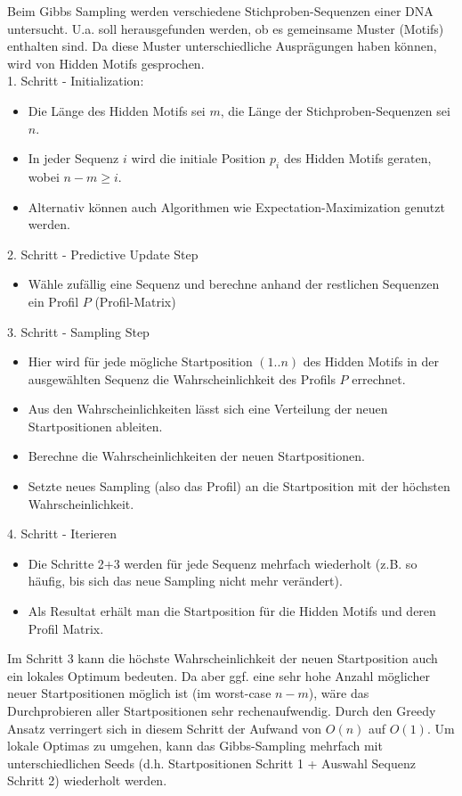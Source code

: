 \documentclass{homework}
\begin{document}
\begin{enumerate}
Beim Gibbs Sampling werden verschiedene Stichproben-Sequenzen einer DNA untersucht. U.a. soll herausgefunden werden, ob es gemeinsame Muster (Motifs) enthalten sind. Da diese Muster unterschiedliche Ausprägungen haben können, wird von Hidden Motifs gesprochen.\\
1. Schritt - Initialization:
\begin{itemize}
	\item Die Länge des Hidden Motifs sei $m$, die Länge der Stichproben-Sequenzen sei $n$.
	\item In jeder Sequenz $i$ wird die initiale Position $p_i$ des Hidden Motifs geraten, wobei $n-m \geq i$.
	\item Alternativ können auch Algorithmen wie Expectation-Maximization genutzt werden.
\end{itemize}
2. Schritt - Predictive Update Step
\begin{itemize}
	\item Wähle zufällig eine Sequenz und berechne anhand der restlichen Sequenzen ein Profil $P$ (Profil-Matrix)
\end{itemize}
3. Schritt - Sampling Step
\begin{itemize}
	\item Hier wird für jede mögliche Startposition $(1..n)$ des Hidden Motifs in der ausgewählten Sequenz die Wahrscheinlichkeit des Profils $P$ errechnet.
	\item Aus den Wahrscheinlichkeiten lässt sich eine Verteilung der neuen Startpositionen ableiten.
	\item Berechne die Wahrscheinlichkeiten der neuen Startpositionen.
	\item Setzte neues Sampling (also das Profil) an die Startposition mit der höchsten Wahrscheinlichkeit.
\end{itemize}
4. Schritt - Iterieren
\begin{itemize}
	\item Die Schritte 2+3 werden für jede Sequenz mehrfach wiederholt (z.B. so häufig, bis sich das neue Sampling nicht mehr verändert).
	\item Als Resultat erhält man die Startposition für die Hidden Motifs und deren Profil Matrix.
\end{itemize}

Im Schritt 3 kann die höchste Wahrscheinlichkeit der neuen Startposition auch ein lokales Optimum bedeuten. Da aber ggf. eine sehr hohe Anzahl möglicher neuer Startpositionen möglich ist (im worst-case $n-m$), wäre das Durchprobieren aller Startpositionen sehr rechenaufwendig. Durch den Greedy Ansatz verringert sich in diesem Schritt der Aufwand von $O(n)$ auf $O(1)$. Um lokale Optimas zu umgehen, kann das Gibbs-Sampling mehrfach mit unterschiedlichen Seeds (d.h. Startpositionen Schritt 1 + Auswahl Sequenz Schritt 2) wiederholt werden. 


\end{enumerate}
\end{document}
